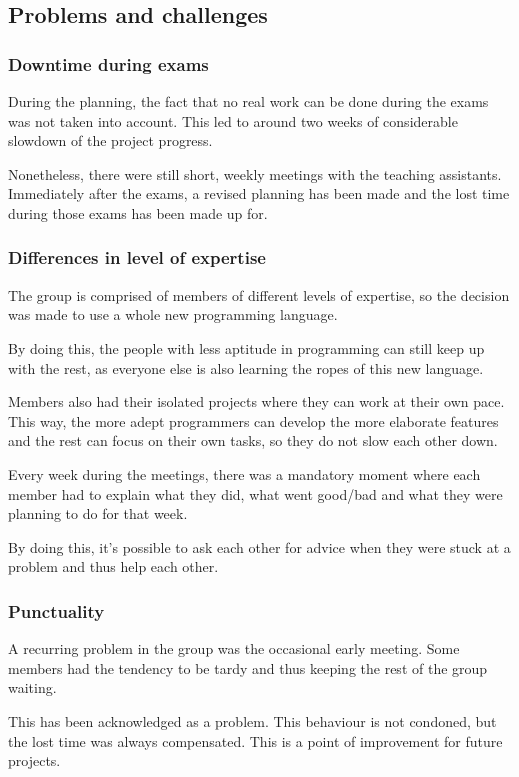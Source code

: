 \documentclass[10pt,a4paper]{report}
\begin{document}
		\subsection{Problems and challenges}
			\subsubsection*{Downtime during exams}
				During the planning, the fact that no real work can be done during the exams was not taken into account. This led to around two weeks of considerable slowdown of the project progress.
				
				Nonetheless, there were still short, weekly meetings with the teaching assistants. Immediately after the exams, a revised planning has been made and the lost time during those exams has been made up for.
			\subsubsection*{Differences in level of expertise}
				The group is comprised of members of different levels of expertise, so the decision was made to use a whole new programming language.
				
				By doing this, the people with less aptitude in programming can still keep up with the rest, as everyone else is also learning the ropes of this new language.
				
				Members also had their isolated projects where they can work at their own pace. This way, the more adept programmers can develop the more elaborate features and the rest can focus on their own tasks, so they do not slow each other down.
				
				Every week during the meetings, there was a mandatory moment where each member had to explain what they did, what went good/bad and what they were planning to do for that week.
				
				By doing this, it's possible to ask each other for advice when they were stuck at a problem and thus help each other.
			\subsubsection*{Punctuality}
				A recurring problem in the group was the occasional early meeting. Some members had the tendency to be tardy and thus keeping the rest of the group waiting.
				
				This has been acknowledged as a problem. This behaviour is not condoned, but the lost time was always compensated. This is a point of improvement for future projects.
\end{document}
